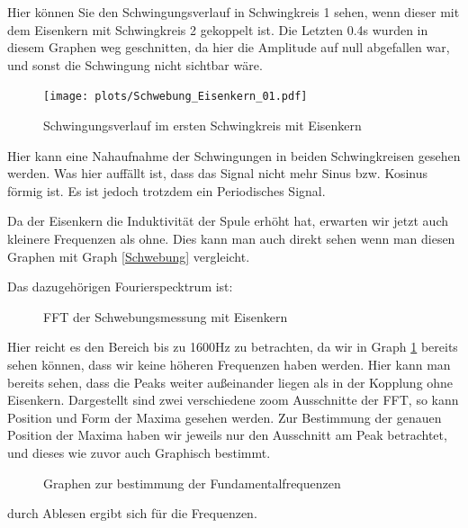 \documentclass[twoside]{protokoll}
\begin{document}
Hier können Sie den Schwingungsverlauf in Schwingkreis 1 sehen, wenn dieser mit dem Eisenkern mit Schwingkreis 2 gekoppelt ist. 
Die Letzten 0.4s wurden in diesem Graphen weg geschnitten, da hier die Amplitude auf null abgefallen war, und sonst die Schwingung nicht sichtbar wäre.
\begin{figure}[H]
    \centering
    \texttt{[image: plots/Schwebung\_Eisenkern\_01.pdf]}
    \caption{Schwingungsverlauf im ersten Schwingkreis mit Eisenkern }
    \label{Eisenkern beide Schwingungen}
\end{figure}

Hier kann eine Nahaufnahme der Schwingungen in beiden Schwingkreisen gesehen werden. Was hier auffällt ist, dass das Signal nicht mehr Sinus bzw. Kosinus förmig ist. Es ist jedoch trotzdem ein Periodisches Signal.

Da der Eisenkern die Induktivität der Spule erhöht hat, erwarten wir jetzt auch kleinere Frequenzen als ohne. Dies kann man auch direkt sehen wenn man diesen Graphen mit Graph \ref{Schwebung} vergleicht. 

Das dazugehörigen Fourierspecktrum ist:

\begin{figure}[H]
    \centering
    \hfill
    \caption{FFT der Schwebungsmessung mit Eisenkern }
\end{figure}

Hier reicht es den Bereich bis zu 1600Hz zu betrachten, da wir in Graph \ref{Eisenkern beide Schwingungen} bereits sehen können, dass wir keine höheren Frequenzen haben werden. Hier kann man bereits sehen, dass die Peaks weiter außeinander liegen als in der Kopplung ohne Eisenkern.
Dargestellt sind zwei verschiedene zoom Ausschnitte der FFT, so kann Position und Form der Maxima gesehen werden.
 Zur Bestimmung der genauen Position der Maxima haben wir jeweils nur den Ausschnitt am Peak betrachtet, und dieses wie zuvor auch Graphisch bestimmt.

\begin{figure}[H]
    \centering
    \hfill
    \caption{Graphen zur bestimmung der Fundamentalfrequenzen}
\end{figure}

durch Ablesen ergibt sich für die Frequenzen.
\end{document}
